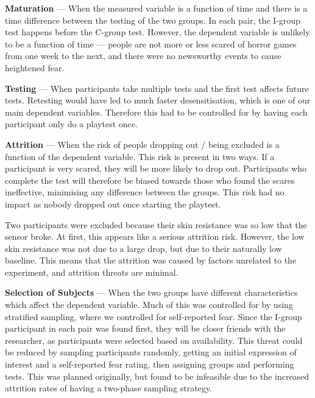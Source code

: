 \documentclass[12pt,a4paper]{article}\usepackage[]{graphicx}\usepackage[]{color}
\begin{document}
\textbf{Maturation} --- When the measured variable is a function of time and there is a time difference between the testing of the two groups.
In each pair, the I-group test happens before the C-group test.
However, the dependent variable is unlikely to be a function of time --- people are not more or less scared of horror games from one week to the next, and there were no newsworthy events to cause heightened fear.

\textbf{Testing} --- When participants take multiple tests and the first test affects future tests.
Retesting would have led to much faster desensitisation, which is one of our main dependent variables.
Therefore this had to be controlled for by having each participant only do a playtest once.

\textbf{Attrition} --- When the risk of people dropping out / being excluded is a function of the dependent variable.
This risk is present in two ways.
If a participant is very scared, they will be more likely to drop out.
Participants who complete the test will therefore be biased towards those who found the scares ineffective, minimising any difference between the groups.
This risk had no impact as nobody dropped out once starting the playtest.

Two participants were excluded because their skin resistance was so low that the sensor broke.
At first, this appears like a serious attrition risk.
However, the low skin resistance was not due to a large drop, but due to their naturally low baseline.
This means that the attrition was caused by factors unrelated to the experiment, and attrition threats are minimal.

\textbf{Selection of Subjects} --- When the two groups have different characteristics which affect the dependent variable.
Much of this was controlled for by using stratified sampling, where we controlled for self-reported fear.
Since the I-group participant in each pair was found first, they will be closer friends with the researcher, as participants were selected based on availability.
This threat could be reduced by sampling participants randomly, getting an initial expression of interest and a self-reported fear rating, then assigning groups and performing tests.
This was planned originally, but found to be infeasible due to the increased attrition rates of having a two-phase sampling strategy.
\end{document}
